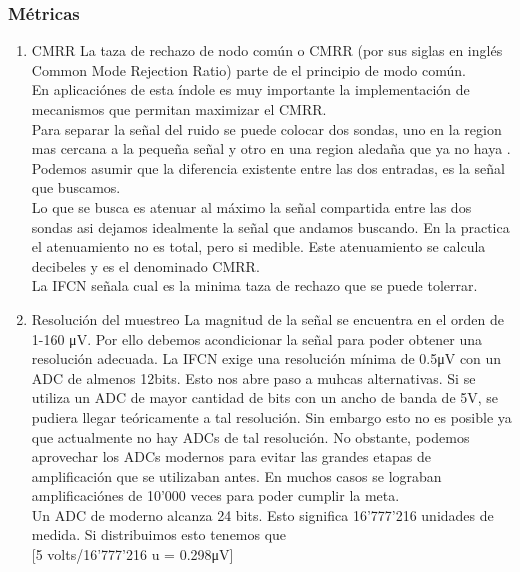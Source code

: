 \subsubsection{Métricas}
\label{sec:orgff5557a}
\begin{enumerate}
\item CMRR
\label{sec:orgc4bc364}
La taza de rechazo de nodo común o CMRR (por sus siglas en inglés Common Mode Rejection Ratio) parte de el principio de modo común.\\
En aplicaciónes de esta índole es muy importante la implementación de mecanismos que permitan maximizar el CMRR.\\

Para separar la señal del ruido se puede colocar dos sondas, uno en la region mas cercana a la pequeña señal y otro en una region aledaña que ya no haya . Podemos asumir que la diferencia existente entre las dos entradas, es la señal que buscamos.\\

Lo que se busca es atenuar al máximo la señal compartida entre las dos sondas asi dejamos idealmente la señal que andamos buscando. En la practica el atenuamiento no es total, pero si medible. Este atenuamiento se calcula decibeles y es el denominado CMRR.\\

La IFCN señala cual es la minima taza de rechazo que se puede tolerrar.\\

\item Resolución del muestreo
\label{sec:orgfe4ff67}
La magnitud de la señal se encuentra en el orden de 1-160 μV. Por ello debemos acondicionar la señal para poder obtener una resolución adecuada. La IFCN exige una resolución mínima de 0.5μV con un ADC de almenos 12bits. Esto nos abre paso a muhcas alternativas. Si se utiliza un ADC de mayor cantidad de bits con un ancho de banda de 5V, se pudiera llegar teóricamente a tal resolución. Sin embargo esto no es posible ya que actualmente no hay ADCs de tal resolución. No obstante, podemos aprovechar los ADCs modernos para evitar las grandes etapas de amplificación que se utilizaban antes. En muchos casos se lograban amplificaciónes de 10’000 veces para poder cumplir la meta.\\

Un ADC de moderno alcanza 24 bits. Esto significa 16’777’216 unidades de medida. Si distribuimos esto tenemos que\\

[5 volts/16’777’216 u = 0.298μV]\\


\end{enumerate}
